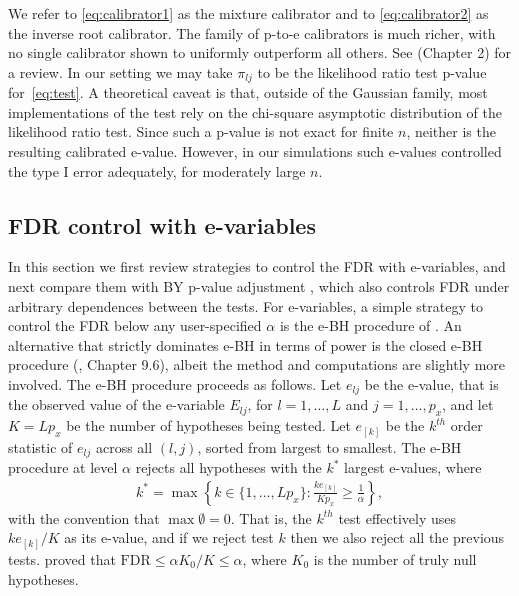 \documentclass[pdflatex,sn-mathphys-num]{sn-jnl}%
\theoremstyle{thmstyleone}%
\theoremstyle{thmstyletwo}%
\theoremstyle{thmstylethree}%
\begin{document}
We refer to \eqref{eq:calibrator1} as the mixture calibrator and to \eqref{eq:calibrator2} as the inverse root calibrator.
The family of p-to-e calibrators is much richer, with no single calibrator shown to uniformly outperform all others. See \cite{ramdas:2025} (Chapter 2) for a review. In our setting we may take $\pi_{lj}$ to be the likelihood ratio test p-value for~\eqref{eq:test}. %
A theoretical caveat is that, outside of the Gaussian family, most implementations of the test rely on the chi-square asymptotic distribution of the likelihood ratio test. Since such a p-value is not exact for finite $n$, neither is the resulting calibrated e-value.
However, in our simulations such e-values controlled the type I error adequately, for moderately large $n$.



\subsection{FDR control with e-variables}
\label{ssec:fdr_control}

\color{blue}
In this section we first review strategies to control the FDR with e-variables, and next compare them with BY p-value adjustment \citep{benjamini:2001}, which also controls FDR under arbitrary dependences between the tests.
\color{black}
For e-variables, a simple strategy to control the FDR below any user-specified $\alpha$ is the e-BH procedure of \cite{wang_ruodu:2022}. An alternative that strictly dominates e-BH in terms of power is the closed e-BH procedure (\cite{ramdas:2025}, Chapter 9.6), %
albeit the method and computations are slightly more involved.
The e-BH procedure proceeds as follows.
Let $e_{lj}$ be the e-value, that is the observed value of the e-variable $E_{lj}$, for $l=1,\ldots,L$ and $j=1,\ldots,p_x$, and let $K= L p_x$ be the number of hypotheses being tested.
Let $e_{[k]}$ be the $k^{th}$ order statistic of $e_{lj}$ across all $(l,j)$, sorted from largest to smallest. The e-BH procedure at level $\alpha$ rejects all hypotheses with the $k^*$ largest e-values, where
\begin{align}
 k^*= \max \left\{ k \in \{1, \ldots, L p_x \} : \frac{k e_{[k]}}{K p_x} \geq \frac{1}{\alpha}  \right\},
\nonumber
\end{align}
with the convention that $\max \emptyset = 0$.
That is, the $k^{th}$ test effectively uses $k e_{[k]} / K$ as its e-value, and if we reject test $k$ then we also reject all the previous tests.
\cite{wang_ruodu:2022} proved that 
$\mbox{FDR} \leq \alpha K_0 / K \leq \alpha$, where $K_0$ is the number of truly null hypotheses.
\end{document}
